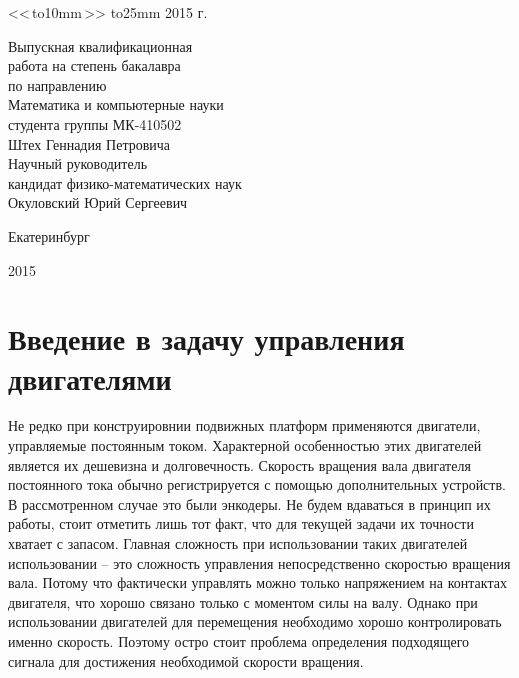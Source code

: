 \documentclass[14pt]{extreport}
\begin{document}
\begin{titlepage}
{\begin{parbox}[t]{9cm}
{                <<\,\hbox to10mm{\hrulefill}\,>>  \hbox to25mm{\hrulefill}  2015 г.
            }
            \end{parbox}
            \begin{parbox}[t]{9cm}{\small  {}
                Выпускная квалификационная \\
                работа на степень бакалавра\\
                 по направлению\\
                Математика и компьютерные науки\\
                студента группы МК-410502 \\
                                \bigskip
                Штех Геннадия Петровича\\
                Научный руководитель\\
                кандидат физико-математических наук \\
                Окуловский Юрий Сергеевич\\
            }
            \end{parbox}
        \vfill
        \centerline{Екатеринбург}
        \centerline{2015}
        }\restoregeometry
    \end{titlepage}
\newpage
    \tableofcontents

\newpage
    \chapter{Введение в задачу управления двигателями}
        Не редко при конструировнии подвижных платформ применяются двигатели, управляемые постоянным током. Характерной особенностью этих двигателей является их дешевизна и долговечность. Скорость вращения вала двигателя постоянного тока обычно регистрируется с помощью дополнительных устройств. В рассмотренном случае это были энкодеры. Не будем вдаваться в принцип их работы, стоит отметить лишь тот факт, что для текущей задачи их точности хватает с запасом. Главная сложность при использовании таких двигателей использовании -- это сложность управления непосредственно скоростью вращения вала. Потому что фактически управлять можно только напряжением на контактах двигателя, что хорошо связано только с моментом силы на валу. Однако при использовании двигателей для перемещения необходимо хорошо контролировать именно скорость. Поэтому остро стоит проблема определения подходящего сигнала для достижения необходимой скорости вращения.
\end{document}
